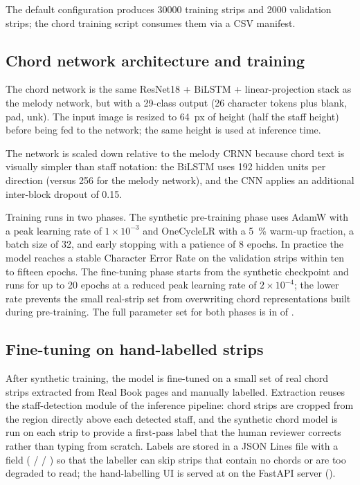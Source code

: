 The default configuration produces \num{30000} training strips and
\num{2000} validation strips; the chord training script consumes them
via a CSV manifest.

\subsection{Chord network architecture and training}

The chord network is the same ResNet18 + BiLSTM + linear-projection
stack as the melody network, but with a \num{29}-class output
(\num{26} character tokens plus blank, pad, unk).
The input image is resized to \SI{64}{px} of height (half the staff
height) before being fed to the network; the same height is used at
inference time.

The network is scaled down relative to the melody CRNN because chord
text is visually simpler than staff notation: the BiLSTM uses
\num{192} hidden units per direction (versus \num{256} for the melody
network), and the CNN applies an additional inter-block dropout of
\num{0.15}.

Training runs in two phases.
The synthetic pre-training phase uses AdamW with a peak learning rate
of $1{\times}10^{-3}$ and OneCycleLR with a \SI{5}{\percent}
warm-up fraction, a batch size of \num{32}, and early stopping with a
patience of \num{8} epochs.
In practice the model reaches a stable Character Error Rate on the
validation strips within ten to fifteen epochs.
The fine-tuning phase starts from the synthetic checkpoint and runs
for up to \num{20} epochs at a reduced peak learning rate of
$2{\times}10^{-4}$; the lower rate prevents the small real-strip set
from overwriting chord representations built during pre-training.
The full parameter set for both phases is in 
of .

\subsection{Fine-tuning on hand-labelled strips}

After synthetic training, the model is fine-tuned on a small set of
real chord strips extracted from Real Book pages and manually
labelled.
Extraction reuses the staff-detection module of the inference
pipeline: chord strips are cropped from the region directly above each
detected staff, and the synthetic chord model is run on each strip to
provide a first-pass label that the human reviewer corrects rather
than typing from scratch.
Labels are stored in a JSON Lines file with a  field
( /  / ) so that the labeller can
skip strips that contain no chords or are too degraded to read; the
hand-labelling UI is served at  on the FastAPI server
().

